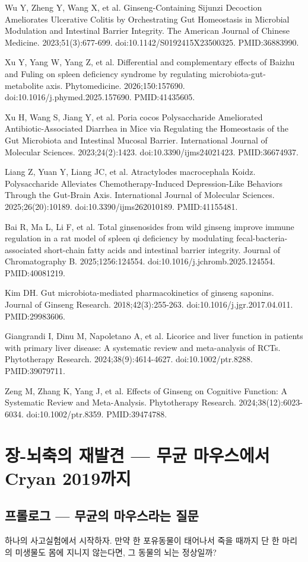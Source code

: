 \documentclass[11pt,oneside]{book}
\newcommand{\refend}{\endgroup\par}
\newcommand{\reff}[2]{\par\hangindent=7mm\hangafter=1\noindent[#1]\hspace{2mm}#2\par}
\begin{document}
\reff{54}{Wu Y, Zheng Y, Wang X, et al. Ginseng-Containing Sijunzi Decoction Ameliorates Ulcerative Colitis by Orchestrating Gut Homeostasis in Microbial Modulation and Intestinal Barrier Integrity. The American Journal of Chinese Medicine. 2023;51(3):677-699. doi:10.1142/S0192415X23500325. PMID:36883990.}
\reff{55}{Xu Y, Yang W, Yang Z, et al. Differential and complementary effects of Baizhu and Fuling on spleen deficiency syndrome by regulating microbiota-gut-metabolite axis. Phytomedicine. 2026;150:157690. doi:10.1016/j.phymed.2025.157690. PMID:41435605.}
\reff{56}{Xu H, Wang S, Jiang Y, et al. Poria cocos Polysaccharide Ameliorated Antibiotic-Associated Diarrhea in Mice via Regulating the Homeostasis of the Gut Microbiota and Intestinal Mucosal Barrier. International Journal of Molecular Sciences. 2023;24(2):1423. doi:10.3390/ijms24021423. PMID:36674937.}
\reff{57}{Liang Z, Yuan Y, Liang JC, et al. Atractylodes macrocephala Koidz. Polysaccharide Alleviates Chemotherapy-Induced Depression-Like Behaviors Through the Gut-Brain Axis. International Journal of Molecular Sciences. 2025;26(20):10189. doi:10.3390/ijms262010189. PMID:41155481.}
\reff{58}{Bai R, Ma L, Li F, et al. Total ginsenosides from wild ginseng improve immune regulation in a rat model of spleen qi deficiency by modulating fecal-bacteria-associated short-chain fatty acids and intestinal barrier integrity. Journal of Chromatography B. 2025;1256:124554. doi:10.1016/j.jchromb.2025.124554. PMID:40081219.}
\reff{59}{Kim DH. Gut microbiota-mediated pharmacokinetics of ginseng saponins. Journal of Ginseng Research. 2018;42(3):255-263. doi:10.1016/j.jgr.2017.04.011. PMID:29983606.}
\reff{60}{Giangrandi I, Dinu M, Napoletano A, et al. Licorice and liver function in patients with primary liver disease: A systematic review and meta-analysis of RCTs. Phytotherapy Research. 2024;38(9):4614-4627. doi:10.1002/ptr.8288. PMID:39079711.}
\reff{61}{Zeng M, Zhang K, Yang J, et al. Effects of Ginseng on Cognitive Function: A Systematic Review and Meta-Analysis. Phytotherapy Research. 2024;38(12):6023-6034. doi:10.1002/ptr.8359. PMID:39474788.}
\refend


\chapter{장-뇌축의 재발견 — 무균 마우스에서 Cryan 2019까지}

\section{프롤로그 — 무균의 마우스라는 질문}
하나의 사고실험에서 시작하자. 만약 한 포유동물이 태어나서 죽을 때까지 단 한 마리의 미생물도 몸에 지니지 않는다면, 그 동물의 뇌는 정상일까?
\end{document}
